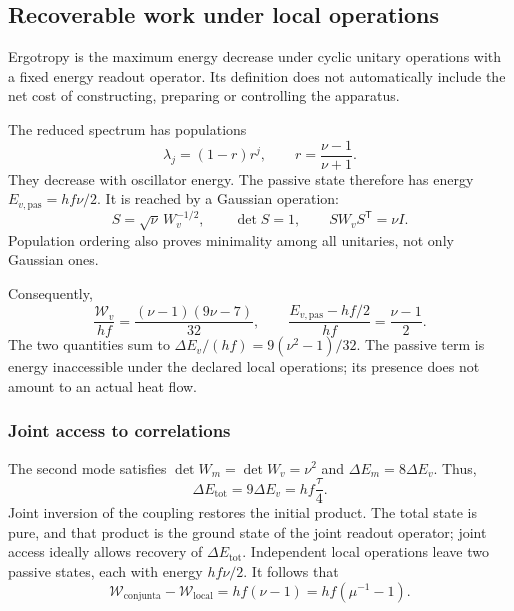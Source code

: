 \subsection{Recoverable work under local operations}
\label{md:aux:ergotropia}

Ergotropy is the maximum energy decrease under cyclic unitary
operations with a fixed energy readout operator.
Its definition does not automatically include the net cost of
constructing, preparing or controlling the apparatus.

The reduced spectrum has populations
\begin{equation}
 \lambda_j=(1-r)r^j,\qquad r=\frac{\nu-1}{\nu+1}.
 \label{md:aux:espectro-gaussiano}
\end{equation}
They decrease with oscillator energy.
The passive state therefore has energy $E_{v,\mathrm{pas}}=hf\nu/2$.
It is reached by a Gaussian operation:
\begin{equation}
 S=\sqrt\nu\,W_v^{-1/2},\qquad
 \det S=1,\qquad SW_vS^{\mathsf T}=\nu I.
 \label{md:aux:pasivacion}
\end{equation}
Population ordering also proves minimality among all unitaries,
not only Gaussian ones.

Consequently,
\begin{equation}
 \boxed{
 \frac{\mathcal W_v}{hf}
 =\frac{(\nu-1)(9\nu-7)}{32},\qquad
 \frac{E_{v,\mathrm{pas}}-hf/2}{hf}=\frac{\nu-1}{2}.}
 \label{md:aux:trabajo-visible}
\end{equation}
The two quantities sum to
$\Delta E_v/(hf)=9(\nu^2-1)/32$. The passive term is energy
inaccessible under the declared local operations; its presence does
not amount to an actual heat flow.

\subsubsection{Joint access to correlations}
\label{md:aux:acceso-conjunto}

The second mode satisfies $\det W_m=\det W_v=\nu^2$ and
$\Delta E_m=8\Delta E_v$. Thus,
\begin{equation}
 \Delta E_{\mathrm{tot}}=9\Delta E_v=hf\frac\tau4.
 \label{md:aux:energia-conjunta}
\end{equation}
Joint inversion of the coupling restores the initial product.
The total state is pure, and that product is the ground state of
the joint readout operator; joint access ideally allows recovery of
$\Delta E_{\mathrm{tot}}$.
Independent local operations leave two passive states, each with
energy $hf\nu/2$. It follows that
\begin{equation}
 \boxed{\mathcal W_{\mathrm{conjunta}}-\mathcal W_{\mathrm{local}}
 =hf(\nu-1)=hf(\mu^{-1}-1).}
 \label{md:aux:ventaja-conjunta}
\end{equation}

